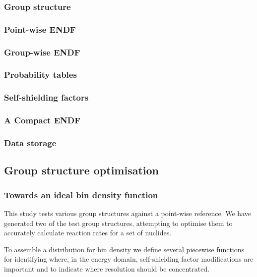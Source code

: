 \subsubsection{Group structure}

\subsubsection{Point-wise ENDF}

\subsubsection{Group-wise ENDF}

\subsubsection{Probability tables}

\subsubsection{Self-shielding factors}

\subsubsection{A Compact ENDF}

\subsubsection{Data storage }

\subsection{Group structure optimisation}
\label{subsec:opt}

\subsubsection{Towards an ideal bin density function}
This study tests various group structures against a point-wise reference. We have generated two of the test group structures, attempting to optimise them to accurately calculate reaction rates for a set of nuclides.

To assemble a distribution for bin density we define several piecewise functions for identifying where, in the energy domain, self-shielding factor modifications are important and to indicate where resolution should be concentrated. 

